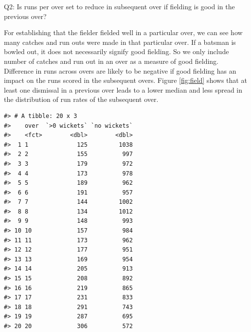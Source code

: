 \documentclass[12pt]{article}
\newenvironment{Shaded}{\begin{snugshade}}{\end{snugshade}}
\newcommand{\KeywordTok}[1]{\textcolor[rgb]{0.13,0.29,0.53}{\textbf{#1}}}
\newcommand{\NormalTok}[1]{#1}
\newcommand{\OperatorTok}[1]{\textcolor[rgb]{0.81,0.36,0.00}{\textbf{#1}}}
\newcommand{\StringTok}[1]{\textcolor[rgb]{0.31,0.60,0.02}{#1}}
\begin{document}
Q2: Is runs per over set to reduce in subsequent over if fielding is good in the previous over?

For establishing that the fielder fielded well in a particular over, we can see how many catches and run outs were made in that particular over. If a batsman is bowled out, it does not necessarily signify good fielding. So we only include number of catches and run out in an over as a measure of good fielding. Difference in runs across overs are likely to be negative if good fielding has an impact on the runs scored in the subsequent overs. Figure \ref{fig:field} shows that at least one dismissal in a previous over leads to a lower median and less spread in the distribution of run rates of the subsequent over.

\begin{Shaded}
\end{Shaded}

\begin{verbatim}
#> # A tibble: 20 x 3
#>    over  `>0 wickets` `no wickets`
#>    <fct>        <dbl>        <dbl>
#>  1 1              125         1038
#>  2 2              155          997
#>  3 3              179          972
#>  4 4              173          978
#>  5 5              189          962
#>  6 6              191          957
#>  7 7              144         1002
#>  8 8              134         1012
#>  9 9              148          993
#> 10 10             157          984
#> 11 11             173          962
#> 12 12             177          951
#> 13 13             169          954
#> 14 14             205          913
#> 15 15             208          892
#> 16 16             219          865
#> 17 17             231          833
#> 18 18             291          743
#> 19 19             287          695
#> 20 20             306          572
\end{verbatim}

\begin{Shaded}
\end{Shaded}
\end{document}
